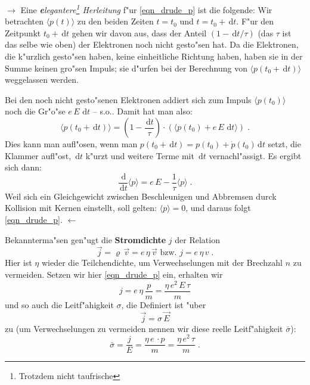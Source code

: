 \documentclass[twoside,a4paper]{book}
\newcommand{\st}[1]{{\slshape \textbf #1}}
\newcommand{\diff}{\ensuremath{\, \mathrm{d}}}
\newenvironment*{Einschub}[0]{$\rightarrow$ \indent}{$\leftarrow$}
\begin{document}
\begin{Einschub}
   Eine \st{elegantere\footnote{Trotzdem nicht taufrische} Herleitung}
   f"ur \eqref{eqn_drude_p} ist die folgende: Wir betrachten $\langle p(t)
   \rangle$ zu den beiden Zeiten $t = t_0$ und $t = t_0 + \diff
   t$. F"ur den Zeitpunkt $t_0 + \diff t$ gehen wir davon aus, dass
   der Anteil $(1 - \diff t / \tau)$ (das $\tau$ ist das selbe wie
   oben) der Elektronen noch nicht gesto"sen hat. Da die Elektronen,
   die k"urzlich gesto"sen haben, keine einheitliche Richtung haben,
   haben sie in der Summe keinen gro"sen Impuls; sie d"urfen bei der
   Berechnung von $\langle p(t_0 + \diff t) \rangle$ weggelassen
   werden.

   Bei den noch nicht gesto"senen Elektronen addiert sich zum Impuls
   $\langle p(t_0) \rangle$ noch die Gr"o"se $e\, E\, \diff t$ --
   s.o.. Damit hat man also:
   \begin{equation*}
      \langle p(t_0 + \diff t) \rangle = \left ( 1 - \frac{\diff
           t}{\tau} \right ) \cdot \left ( \langle p(t_0) + e\, E\,
         \diff t  \rangle \right ) \;.
   \end{equation*}
   Dies kann man aufl"osen, wenn man $p(t_0 + \diff t) = p(t_0) + \dot
   p(t_0) \diff t$ setzt, die Klammer aufl"ost, $\diff t$ k"urzt und
   weitere Terme mit $\diff t$ vernachl"assigt. Es ergibt sich dann:
   \begin{equation}
      \label{eq:29}
      \frac{\diff }{\diff t} \langle p \rangle = e\, E -
      \frac{1}{\tau} \langle p \rangle \;.
   \end{equation} 
   Weil sich ein Gleichgewicht zwischen Beschleunigen und Abbremsen
   durck Kollision mit Kernen einstellt, soll gelten: $\langle p
   \rangle = 0$, und daraus folgt \eqref{eqn_drude_p}. 
\end{Einschub}

Bekannterma"sen gen"ugt die \textbf{Stromdichte}
$j$ der Relation
\begin{equation}
   \label{eqn_stromdichte}
   \vec j = \varrho \, \vec v = e\, \eta\, \vec v \text{ bzw. } j =
   e\, \eta \, v \;.
\end{equation}
Hier ist $\eta$ wieder die Teilchendichte, um Verwechselungen mit der
Brechzahl $n$ zu vermeiden. Setzen wir hier \eqref{eqn_drude_p} ein,
erhalten wir
\begin{equation}
   \label{eqn_drude_j}
   j = e\, \eta\, \frac{p}{m} = \frac{\eta\, e^2 \, E\, \tau}{m}
\end{equation}
und so auch die Leitf"ahigkeit $\sigma$, die
Definiert ist "uber
\begin{equation}
   \label{eqn_leitfaehigkeit}
   \vec j = \sigma \, \vec E 
\end{equation}
zu (um Verwechselungen zu vermeiden nennen wir diese reelle
Leitf"ahigkeit $\bar \sigma$):
\begin{equation}
   \label{eqn_drude_sigma}
   \bar \sigma = \frac{j}{E} = \frac{\eta\, e\, \cdot p}{m}= \frac{\eta\, e^2\, \tau}{m} \;.
\end{equation}
\end{document}
